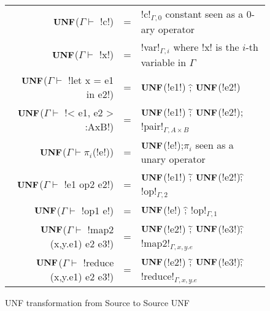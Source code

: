 \begin{figure*}[t]
    \begin{tabular}{r c l}
    $\mathbf{UNF}$($\Gamma\vdash $ !c!) &=& !c!$_{\Gamma,0}$ constant seen as a 0-ary operator\\
    $\mathbf{UNF}$($\Gamma\vdash $ !x!) &=& !var!$_{\Gamma,i}$ where !x! is the $i$-th variable in $\Gamma$ \\
    $\mathbf{UNF}$($\Gamma\vdash $ !let x = e1 in e2!) &=& $\mathbf{UNF}$(!e1!) $\widehat{;}$ $\mathbf{UNF}$(!e2!) \\ 
    $\mathbf{UNF}$($\Gamma\vdash $ !< e1, e2 > :AxB!) &=& $\mathbf{UNF}$(!e1!) $\widetilde{;}$ $\mathbf{UNF}$(!e2!); !pair!$_{\Gamma,A\times B}$ \\ 
    $\mathbf{UNF}$($\Gamma\vdash \pi_i$(!e!)) &=& $\mathbf{UNF}$(!e!);$\pi_i$ seen as a unary operator\\
    $\mathbf{UNF}$($\Gamma\vdash $ !e1 op2 e2!) &=& $\mathbf{UNF}$(!e1!) $\widetilde{;}$ $\mathbf{UNF}$(!e2!)$\widehat{;}$ !op!$_{\Gamma,2}$\\
    $\mathbf{UNF}$($\Gamma\vdash $ !op1 e!) &=& $\mathbf{UNF}$(!e!) $\widehat{;}$ !op!$_{\Gamma,1}$ \\
    $\mathbf{UNF}$($\Gamma\vdash $ !map2 (x,y.e1) e2 e3!) &=& $\mathbf{UNF}$(!e2!) $\widetilde{;}$ $\mathbf{UNF}$(!e3!)$\widehat{;}$ !map2!$_{\Gamma, x,y.e}$ \\ 
    $\mathbf{UNF}$($\Gamma\vdash $ !reduce (x,y.e1) e2 e3!) &=& $\mathbf{UNF}$(!e2!) $\widetilde{;}$ $\mathbf{UNF}$(!e3!)$\widehat{;}$ !reduce!$_{\Gamma, x,y.e}$ \\ 
    \end{tabular}
    \caption{UNF transformation from Source to Source UNF}
    \label{fig:source_to_unf}
    \end{figure*}